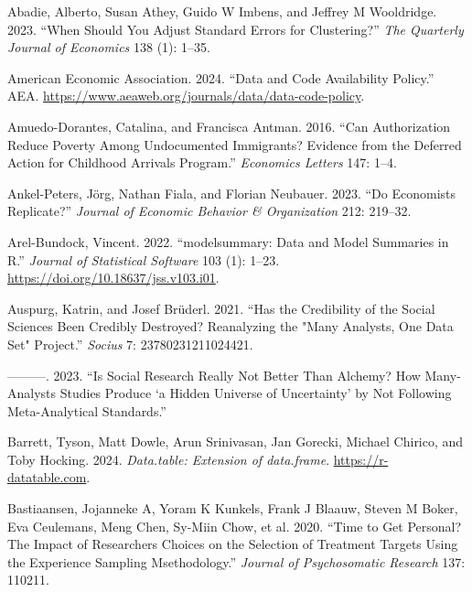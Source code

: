 \documentclass[
  letterpaper,
  DIV=11,
  numbers=noendperiod]{scrartcl}
\newlength{\cslhangindent}
\newlength{\cslentryspacingunit} %
\newenvironment{CSLReferences}[2] %
 {%
  \setlength{\parindent}{0pt}
  \ifodd #1
  \let\oldpar\par
  \def\par{\hangindent=\cslhangindent\oldpar}
  \fi
  \setlength{\parskip}{#2\cslentryspacingunit}
 }%
 {}
\begin{document}
\hypertarget{refs}{}
\begin{CSLReferences}{1}{0}
\leavevmode{}%
Abadie, Alberto, Susan Athey, Guido W Imbens, and Jeffrey M Wooldridge.
2023. {``When Should You Adjust Standard Errors for Clustering?''}
\emph{The Quarterly Journal of Economics} 138 (1): 1--35.

\leavevmode{}%
American Economic Association. 2024. {``Data and Code Availability
Policy.''} AEA.
\url{https://www.aeaweb.org/journals/data/data-code-policy}.

\leavevmode{}%
Amuedo-Dorantes, Catalina, and Francisca Antman. 2016. {``Can
Authorization Reduce Poverty Among Undocumented Immigrants? Evidence
from the Deferred Action for Childhood Arrivals Program.''}
\emph{Economics Letters} 147: 1--4.

\leavevmode{}%
Ankel-Peters, Jörg, Nathan Fiala, and Florian Neubauer. 2023. {``Do
Economists Replicate?''} \emph{Journal of Economic Behavior \&
Organization} 212: 219--32.

\leavevmode{}%
Arel-Bundock, Vincent. 2022. {``{modelsummary}: Data and Model Summaries
in {R}.''} \emph{Journal of Statistical Software} 103 (1): 1--23.
\url{https://doi.org/10.18637/jss.v103.i01}.

\leavevmode{}%
Auspurg, Katrin, and Josef Brüderl. 2021. {``Has the Credibility of the
Social Sciences Been Credibly Destroyed? Reanalyzing the "Many Analysts,
One Data Set" Project.''} \emph{Socius} 7: 23780231211024421.

\leavevmode{}%
---------. 2023. {``Is Social Research Really Not Better Than Alchemy?
How Many-Analysts Studies Produce {`a Hidden Universe of Uncertainty'}
by Not Following Meta-Analytical Standards.''}

\leavevmode{}%
Barrett, Tyson, Matt Dowle, Arun Srinivasan, Jan Gorecki, Michael
Chirico, and Toby Hocking. 2024. \emph{Data.table: Extension of
{data.frame}}. \url{https://r-datatable.com}.

\leavevmode{}%
Bastiaansen, Jojanneke A, Yoram K Kunkels, Frank J Blaauw, Steven M
Boker, Eva Ceulemans, Meng Chen, Sy-Miin Chow, et al. 2020. {``Time to
Get Personal? The Impact of Researchers Choices on the Selection of
Treatment Targets Using the Experience Sampling Msethodology.''}
\emph{Journal of Psychosomatic Research} 137: 110211.


\end{CSLReferences}
\end{document}

